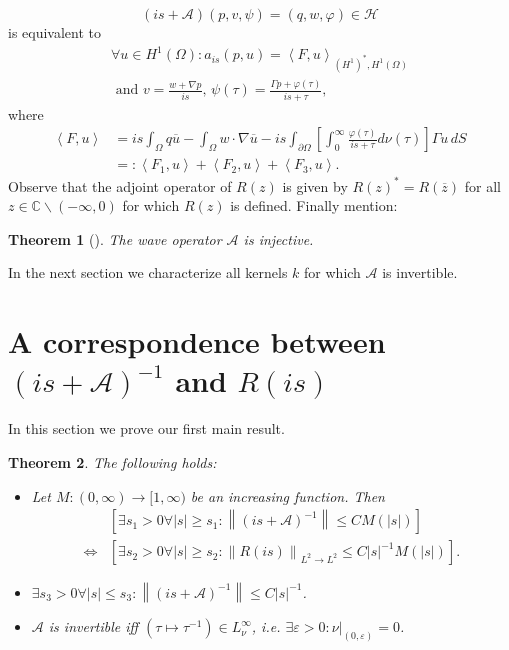 \documentclass{amsart}
\newcommand{\abs}[1]{\left|#1\right|}
\newcommand{\norm}[1]{\left\| #1 \right\|}
\newcommand{\dual}[2]{\left\langle #1 , #2\right\rangle}
\newcommand{\A}{\mathcal{A}}
\newcommand{\Ho}{\mathcal{H}}
\newcommand{\C}{\mathbb{C}}
\newtheorem{Theorem}{Theorem}
\begin{document}
\begin{equation}\label{A}
 (is+\A) (p, v, \psi) = (q, w, \varphi) \in \Ho
\end{equation}
is equivalent to
\begin{align}
 \label{R}
 \forall u\in H^1(\Omega): a_{is}(p, u) = \dual{F}{u}_{(H^1)^*,H^1(\Omega)} \\ \nonumber
  \text{ and } v = \frac{w + \nabla p}{is}, \, \psi(\tau) = \frac{\Gamma p + \varphi(\tau)}{is + \tau},
\end{align}
where
\begin{align}\nonumber
 \dual{F}{u} &= is\int_{\Omega} q \overline{u} - \int_{\Omega} w\cdot\nabla\overline{u} 
 - is\int_{\partial\Omega} \left[ \int_0^{\infty} \frac{\varphi(\tau)}{is+\tau} d\nu(\tau) \right] \Gamma u\, dS \\ \label{eq: F123}
 &=: \dual{F_1}{u} + \dual{F_2}{u} + \dual{F_3}{u} .
\end{align}
Observe that the adjoint operator of $R(z)$ is given by $R(z)^* = R(\overline{z})$ for all $z\in\C\backslash(-\infty,0)$ for which $R(z)$ is defined. Finally mention:
\begin{Theorem}[\cite{DFMP2010a}]\label{thm: A is injective}
 The wave operator $\A$ is injective.
\end{Theorem}
In the next section we characterize all kernels $k$ for which $\A$ is invertible.

\section{A correspondence between $(is+\A)^{-1}$ and $R(is)$}\label{sec: Correspondence between resolvents}
In this section we prove our first main result.
\begin{Theorem}\label{thm: Preliminary estimates}
The following holds:
 \begin{itemize}
 \item[(i)] Let $M:(0,\infty)\rightarrow[1,\infty)$ be an increasing function. Then
 \begin{align*}
  &\left[\exists s_1>0 \forall \abs{s}\geq s_1: \norm{(is+\A)^{-1}} \leq C M(\abs{s})\right] \\ \Leftrightarrow 
  &\left[\exists s_2>0 \forall \abs{s}\geq s_2: \norm{R(is)}_{L^2\rightarrow L^2} \leq C \abs{s}^{-1}M(\abs{s}) \right].
 \end{align*}
 \item[(ii)] $\exists s_3>0 \forall \abs{s}\leq s_3: \norm{(is+\A)^{-1}} \leq C \abs{s}^{-1}$.
 \item[(iii)] $\A$ is invertible iff $(\tau\mapsto\tau^{-1})\in L^{\infty}_{\nu}$, i.e. $\exists \varepsilon>0: \nu|_{(0,\varepsilon)}=0$.
 \end{itemize}
\end{Theorem}
\end{document}
